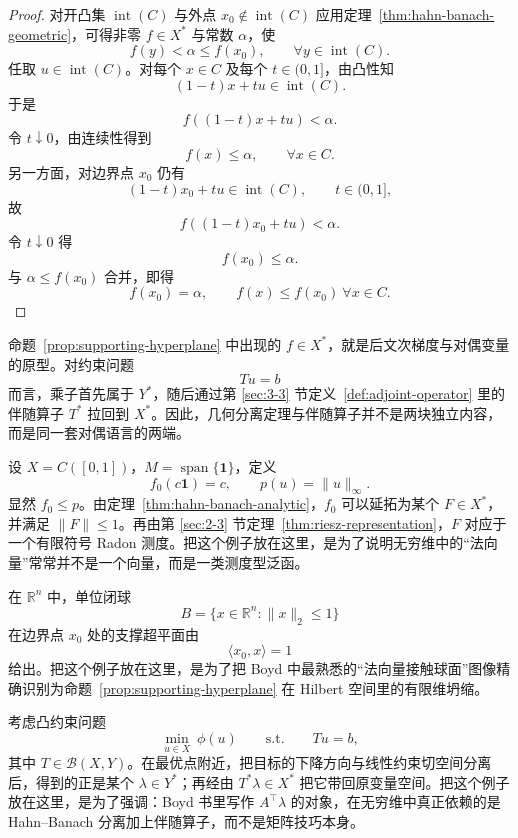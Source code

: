 \begin{proof}
对开凸集 $\operatorname{int}(C)$ 与外点 $x_0\notin \operatorname{int}(C)$ 应用定理~\ref{thm:hahn-banach-geometric}，可得非零 $f\in X^\ast$ 与常数 $\alpha$，使
\[
f(y)<\alpha\le f(x_0),\qquad \forall y\in \operatorname{int}(C).
\]
任取 $u\in \operatorname{int}(C)$。对每个 $x\in C$ 及每个 $t\in(0,1]$，由凸性知
\[
(1-t)x+tu\in \operatorname{int}(C).
\]
于是
\[
f((1-t)x+tu)<\alpha.
\]
令 $t\downarrow 0$，由连续性得到
\[
f(x)\le \alpha,\qquad \forall x\in C.
\]
另一方面，对边界点 $x_0$ 仍有
\[
(1-t)x_0+tu\in \operatorname{int}(C),\qquad t\in(0,1],
\]
故
\[
f((1-t)x_0+tu)<\alpha.
\]
令 $t\downarrow 0$ 得
\[
f(x_0)\le \alpha.
\]
与 $\alpha\le f(x_0)$ 合并，即得
\[
f(x_0)=\alpha,\qquad f(x)\le f(x_0)\ \forall x\in C.
\]
\end{proof}

\begin{remark}
命题~\ref{prop:supporting-hyperplane} 中出现的 $f\in X^\ast$，就是后文次梯度与对偶变量的原型。对约束问题
\[
Tu=b
\]
而言，乘子首先属于 $Y^\ast$，随后通过第 \ref{sec:3-3} 节定义~\ref{def:adjoint-operator} 里的伴随算子 $T^\ast$ 拉回到 $X^\ast$。因此，几何分离定理与伴随算子并不是两块独立内容，而是同一套对偶语言的两端。
\end{remark}

\begin{example}\label{ex:hahn-banach-extension}
设 $X=C([0,1])$，$M=\operatorname{span}\{\mathbf 1\}$，定义
\[
f_0(c\mathbf 1)=c,\qquad p(u)=\|u\|_\infty.
\]
显然 $f_0\le p$。由定理~\ref{thm:hahn-banach-analytic}，$f_0$ 可以延拓为某个 $F\in X^\ast$，并满足 $\|F\|\le 1$。再由第 \ref{sec:2-3} 节定理~\ref{thm:riesz-representation}，$F$ 对应于一个有限符号 Radon 测度。把这个例子放在这里，是为了说明无穷维中的“法向量”常常并不是一个向量，而是一类测度型泛函。
\end{example}

\begin{example}\label{ex:euclidean-supporting-hyperplane}
在 $\mathbb R^n$ 中，单位闭球
\[
B=\{x\in\mathbb R^n:\|x\|_2\le 1\}
\]
在边界点 $x_0$ 处的支撑超平面由
\[
\langle x_0,x\rangle=1
\]
给出。把这个例子放在这里，是为了把 Boyd 中最熟悉的“法向量接触球面”图像精确识别为命题~\ref{prop:supporting-hyperplane} 在 Hilbert 空间里的有限维坍缩。
\end{example}

\begin{example}\label{ex:dual-multiplier-separation}
考虑凸约束问题
\[
\min_{u\in X}\ \phi(u)\qquad \text{s.t.}\qquad Tu=b,
\]
其中 $T\in\mathcal B(X,Y)$。在最优点附近，把目标的下降方向与线性约束切空间分离后，得到的正是某个 $\lambda\in Y^\ast$；再经由 $T^\ast\lambda\in X^\ast$ 把它带回原变量空间。把这个例子放在这里，是为了强调：Boyd 书里写作 $A^\top\lambda$ 的对象，在无穷维中真正依赖的是 Hahn--Banach 分离加上伴随算子，而不是矩阵技巧本身。
\end{example}

